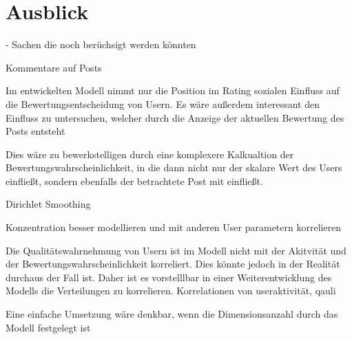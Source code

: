 \chapter{Ausblick}

- Sachen die noch berüchsigt werden könnten

Kommentare auf Posts

Im entwickelten Modell nimmt nur die Position im Rating sozialen Einfluss auf die Bewertungsentscheidung von Usern. Es wäre außerdem interessant den Einfluss zu untersuchen, welcher durch die Anzeige der aktuellen Bewertung des Posts entsteht

Dies wäre zu bewerkstelligen durch eine komplexere Kalkualtion der Bewertungswahrscheinlichkeit, in die dann nicht nur der skalare Wert des Users einfließt, sondern ebenfalls der betrachtete Post mit einfließt.

Dirichlet Smoothing



Konzentration besser modellieren und mit anderen User parametern korrelieren

Die Qualitätswahrnehmung von Usern ist im Modell nicht mit der Akitvität und der Bewertungswahrscheinlichkeit korreliert. Dies könnte jedoch in der Realität durchaus der Fall ist. Daher ist es vorstelllbar in einer Weiterentwicklung des Modells die Verteilungen zu korrelieren. 
Korrelationen von useraktivität, qauli

Eine einfache Umsetzung wäre denkbar, wenn die Dimensionsanzahl durch das Modell festgelegt ist